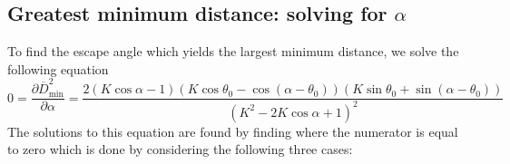 \documentclass[12pt]{article}
\def\d{\partial}
\newcommand{\ol}{\overline}
\begin{document}
\newpage
\subsection{Greatest minimum distance: solving for $\alpha$}
To find the escape angle which yields the largest minimum distance, we solve the following equation
%
\begin{equation}
0 = \frac{\d \ol{D}^2_{\text{min}}}{\d \alpha} = 
\frac{2(K \cos \alpha - 1)(K\cos \theta_0 - \cos(\alpha - \theta_0))(K\sin \theta_0 + \sin(\alpha -\theta_0))}
{(K^2 - 2K \cos \alpha + 1)^2}
\end{equation} 
%
The solutions to this equation are found by finding where the numerator is equal to zero which is done by considering the following three cases:
%
\end{document}
